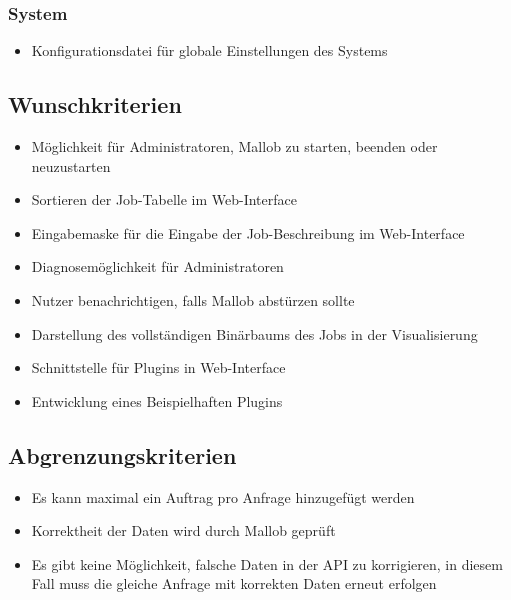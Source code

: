     \subsubsection{System}
        \begin{itemize}[noitemsep]
            \item Konfigurationsdatei für globale Einstellungen des Systems
        \end{itemize}
        
        
\subsection{Wunschkriterien}
    \begin{itemize}[noitemsep]
        \item Möglichkeit für Administratoren, Mallob zu starten, beenden oder neuzustarten
        \item Sortieren der Job-Tabelle im Web-Interface
        \item Eingabemaske für die Eingabe der Job-Beschreibung im Web-Interface
        \item Diagnosemöglichkeit für Administratoren
        \item Nutzer benachrichtigen, falls Mallob abstürzen sollte
        
        \item Darstellung des vollständigen Binärbaums des Jobs in der Visualisierung
        \item Schnittstelle für Plugins in Web-Interface
        \item Entwicklung eines Beispielhaften Plugins
    \end{itemize}
    
\subsection{Abgrenzungskriterien}
    \begin{itemize}[noitemsep]
        \item Es kann maximal ein Auftrag pro Anfrage hinzugefügt werden
        \item Korrektheit der Daten wird durch Mallob geprüft
        \item Es gibt keine Möglichkeit, falsche Daten in der API zu korrigieren, in diesem Fall muss die gleiche Anfrage mit korrekten Daten erneut erfolgen
    \end{itemize}
